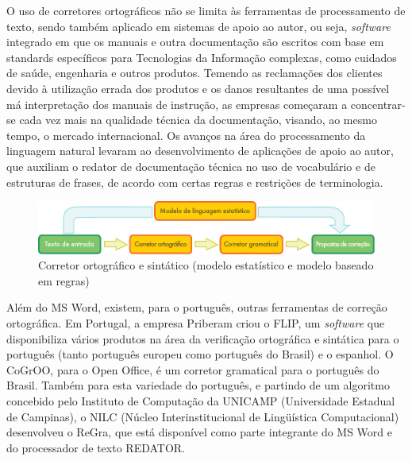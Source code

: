 \begin{multicols}{2}

O uso de corretores ortográficos não se limita às ferramentas de processamento de texto, sendo também aplicado em sistemas de apoio ao autor, ou seja, \textit{software} integrado em que os manuais e outra documentação são escritos com base em standards específicos para Tecnologias da Informação complexas, como cuidados de saúde, engenharia e outros produtos. Temendo as reclamações dos clientes devido à utilização errada dos produtos e os danos resultantes de uma possível má interpretação dos manuais de instrução, as empresas começaram a concentrar-se cada vez mais na qualidade técnica da documentação, visando, ao mesmo tempo, o mercado internacional. Os avanços na área do processamento da linguagem natural levaram ao desenvolvimento de aplicações de apoio ao autor, que auxiliam o redator de documentação técnica no uso de vocabulário e de estruturas de frases, de acordo com certas regras e restrições de terminologia.

\begin{figure}[htb]
  \center
  \includegraphics[width=\textwidth]{../_media/portuguese/language_checking}
  \caption{Corretor ortográfico e sintático (modelo estatístico e modelo baseado em regras)}
  \label{fig:langcheckingaarch_de}
\end{figure}

Além do MS Word, existem, para o português, ou\-tras ferramentas de correção ortográfica. Em Portugal, a empresa Priberam criou o FLIP, um \textit{software} que disponibiliza vários produtos na área da verificação ortográfica e sintática para o português (tanto português europeu como português do Brasil) e o espanhol. O CoGrOO, para o Open Office, é um corretor gramatical para o português do Brasil. Também para esta variedade do português, e partindo de um algoritmo concebido pelo Instituto de Computação da UNICAMP (Universidade Estadual de Campinas), o NILC (Núcleo Interinstitucional de Lingüística Computacional) desenvolveu o ReGra, que está disponível como parte integrante do MS Word e do processador de texto REDATOR.


\end{multicols}
